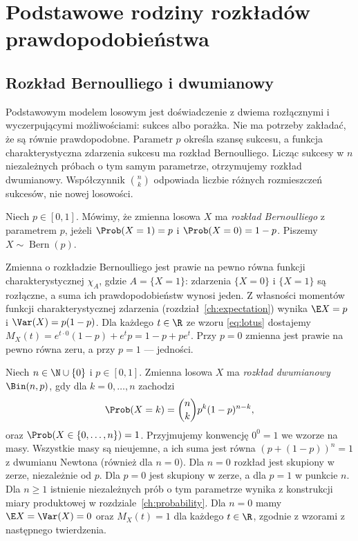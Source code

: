 \chapter{Podstawowe rodziny rozkładów prawdopodobieństwa}
\label{ch:distributions}

\providecommand{\atlasref}[2]{#2}

\section{Rozkład Bernoulliego i dwumianowy}
Podstawowym modelem losowym jest doświadczenie z dwiema
rozłącznymi i wyczerpującymi możliwościami: sukces albo porażka. Nie ma potrzeby zakładać,
że są równie prawdopodobne. Parametr $p$ określa szansę sukcesu,
a funkcja charakterystyczna zdarzenia sukcesu ma rozkład Bernoulliego. Licząc sukcesy
w $n$ niezależnych próbach o tym samym parametrze, otrzymujemy
rozkład dwumianowy. Współczynnik $\binom nk$ odpowiada
liczbie różnych rozmieszczeń sukcesów, nie nowej losowości.

\begin{definicja}
Niech $p\in[0,1]$. Mówimy, że zmienna losowa $X$ ma
\emph{rozkład Bernoulliego} z parametrem $p$, jeżeli
$\Prob(X=1)=p$ i $\Prob(X=0)=1-p$.
Piszemy $X\sim\operatorname{Bern}(p)$.
\end{definicja}

Zmienna o rozkładzie Bernoulliego jest prawie na pewno
równa funkcji charakterystycznej $\chi_A$, gdzie $A=\{X=1\}$:
zdarzenia $\{X=0\}$ i $\{X=1\}$ są rozłączne, a suma ich
prawdopodobieństw wynosi jeden. Z własności momentów
funkcji charakterystycznej zdarzenia (rozdział~\ref{ch:expectation})
wynika $\E X=p$ i $\Var(X)=p(1-p)$.
Dla każdego $t\in\R$ ze wzoru \eqref{eq:lotus} dostajemy
$M_X(t)=e^{t\cdot0}(1-p)+e^tp=1-p+pe^t$.
Przy $p=0$ zmienna jest prawie na pewno równa zeru,
a przy $p=1$ --- jedności.

\begin{definicja}
Niech $n\in\N\cup\{0\}$ i $p\in[0,1]$.
Zmienna losowa $X$ ma \emph{rozkład dwumianowy} $\Bin(n,p)$,
gdy dla $k=0,\ldots,n$ zachodzi
\begin{equation}\label{eq:binomial}
\Prob(X=k)=\binom nk p^k(1-p)^{n-k},
\end{equation}
oraz $\Prob(X\in\{0,\ldots,n\})=1$.
Przyjmujemy konwencję $0^0=1$ we wzorze na masy.
Wszystkie masy są nieujemne, a ich suma jest równa
$(p+(1-p))^n=1$ z dwumianu Newtona (również dla $n=0$).
Dla $n=0$ rozkład jest skupiony w zerze, niezależnie od $p$.
Dla $p=0$ jest skupiony w zerze, a dla $p=1$ w punkcie $n$.
Dla $n\geq1$ istnienie niezależnych prób o tym parametrze
wynika z konstrukcji miary produktowej w rozdziale~\ref{ch:probability}.
Dla $n=0$ mamy $\E X=\Var(X)=0$ oraz $M_X(t)=1$
dla każdego $t\in\R$, zgodnie z wzorami z następnego
twierdzenia.
\end{definicja}

